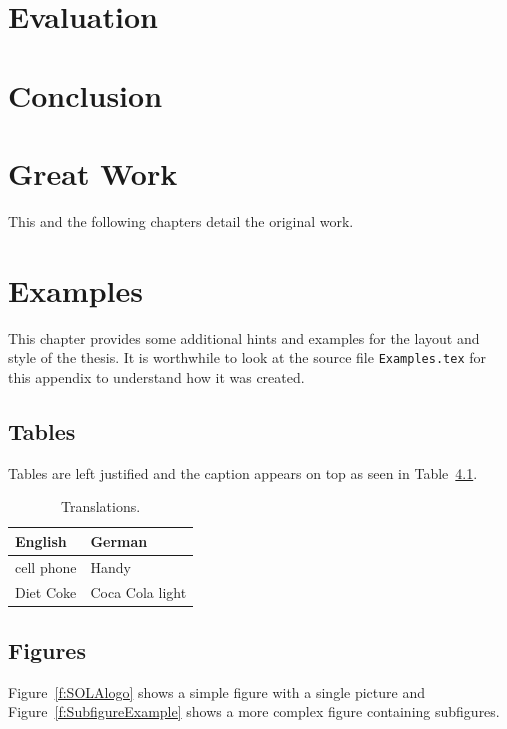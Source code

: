 \documentclass[11pt,a4paper]{book}
\begin{document}
\chapter{Evaluation}

\chapter{Conclusion}

\chapter{Great Work}
\label{s:GreatWork}

This and the following chapters detail the original work.

\chapter{Examples}
\label{s:Examples}

This chapter provides some additional hints and examples for the
layout and style of the thesis. It is worthwhile to look at the source
file \verb|Examples.tex| for this appendix to understand how it was
created.

\section{Tables}

Tables are left justified and the caption appears on top as seen in
Table~\ref{t:Translations}.

\begin{table}[ht]
\centering
\begin{tabular}{ll}
\hline
\textbf{English} & \textbf{German}\\
\hline
cell phone       & Handy\\
Diet Coke        & Coca Cola light\\
\hline
\end{tabular}
\caption[Translations]{\label{t:Translations}Translations.}
\end{table}

\section{Figures}

Figure~\ref{f:SOLAlogo} shows a simple figure with a single picture
and Figure~\ref{f:SubfigureExample} shows a more complex figure
containing subfigures.
\end{document}
